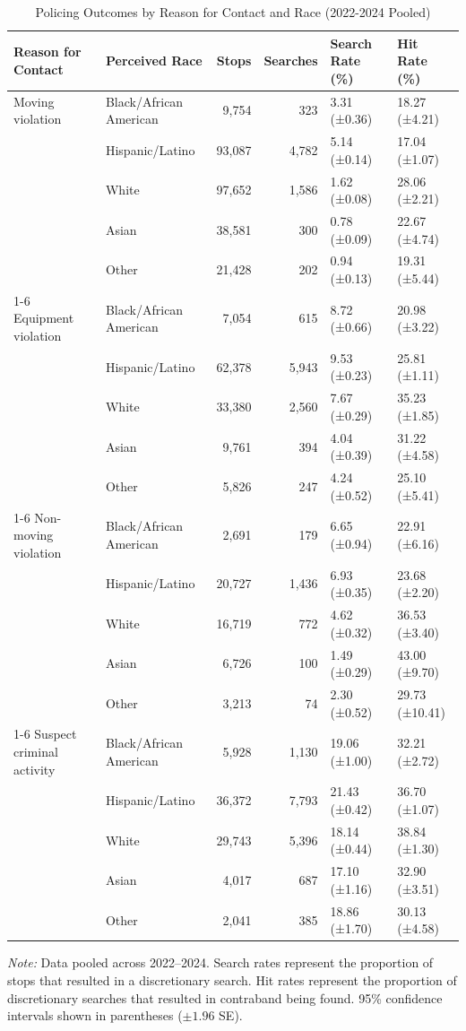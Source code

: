 \begin{table}[H]
\centering
\caption{Policing Outcomes by Reason for Contact and Race (2022-2024 Pooled)}
\label{tab:reason_for_contact}
\begin{tabular}{ll rr ll}
\toprule
Reason for Contact & Perceived Race & Stops & Searches & Search Rate (\%) & Hit Rate (\%) \\
\midrule
Moving violation & Black/African American & 9,754 & 323 & 3.31 (±0.36) & 18.27 (±4.21) \\
 & Hispanic/Latino & 93,087 & 4,782 & 5.14 (±0.14) & 17.04 (±1.07) \\
 & White & 97,652 & 1,586 & 1.62 (±0.08) & 28.06 (±2.21) \\
 & Asian & 38,581 & 300 & 0.78 (±0.09) & 22.67 (±4.74) \\
 & Other & 21,428 & 202 & 0.94 (±0.13) & 19.31 (±5.44) \\
\cmidrule(lr){1-6}
Equipment violation & Black/African American & 7,054 & 615 & 8.72 (±0.66) & 20.98 (±3.22) \\
 & Hispanic/Latino & 62,378 & 5,943 & 9.53 (±0.23) & 25.81 (±1.11) \\
 & White & 33,380 & 2,560 & 7.67 (±0.29) & 35.23 (±1.85) \\
 & Asian & 9,761 & 394 & 4.04 (±0.39) & 31.22 (±4.58) \\
 & Other & 5,826 & 247 & 4.24 (±0.52) & 25.10 (±5.41) \\
\cmidrule(lr){1-6}
Non-moving violation & Black/African American & 2,691 & 179 & 6.65 (±0.94) & 22.91 (±6.16) \\
 & Hispanic/Latino & 20,727 & 1,436 & 6.93 (±0.35) & 23.68 (±2.20) \\
 & White & 16,719 & 772 & 4.62 (±0.32) & 36.53 (±3.40) \\
 & Asian & 6,726 & 100 & 1.49 (±0.29) & 43.00 (±9.70) \\
 & Other & 3,213 & 74 & 2.30 (±0.52) & 29.73 (±10.41) \\
\cmidrule(lr){1-6}
Suspect criminal activity & Black/African American & 5,928 & 1,130 & 19.06 (±1.00) & 32.21 (±2.72) \\
 & Hispanic/Latino & 36,372 & 7,793 & 21.43 (±0.42) & 36.70 (±1.07) \\
 & White & 29,743 & 5,396 & 18.14 (±0.44) & 38.84 (±1.30) \\
 & Asian & 4,017 & 687 & 17.10 (±1.16) & 32.90 (±3.51) \\
 & Other & 2,041 & 385 & 18.86 (±1.70) & 30.13 (±4.58) \\
\bottomrule
\end{tabular}
\smallskip
\parbox{\textwidth}{\footnotesize \textit{Note:} Data pooled across 2022--2024. Search rates represent the proportion of stops that resulted in a discretionary search. Hit rates represent the proportion of discretionary searches that resulted in contraband being found. 95\% confidence intervals shown in parentheses ($\pm 1.96$ SE).}
\end{table}